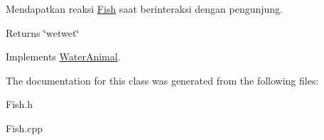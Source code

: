 Mendapatkan reaksi \hyperlink{classFish}{Fish} saat berinteraksi dengan pengunjung. 

\begin{DoxyReturn}{Returns}
\char`\"{}wetwet\char`\"{} 
\end{DoxyReturn}


Implements \hyperlink{classWaterAnimal}{Water\-Animal}.



The documentation for this class was generated from the following files\-:\begin{DoxyCompactItemize}
\item 
Fish.\-h\item 
Fish.\-cpp\end{DoxyCompactItemize}
